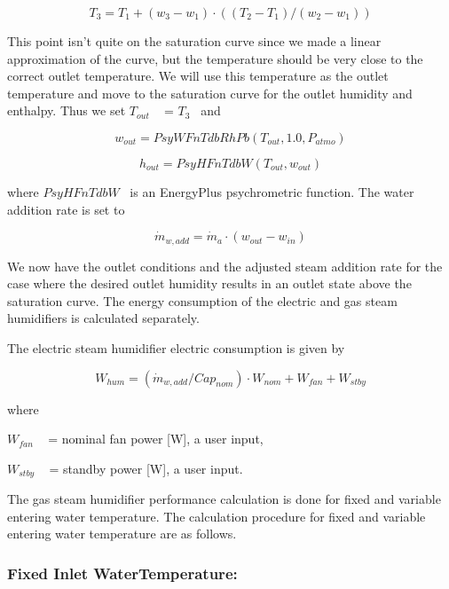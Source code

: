 \begin{equation}
{T_3} = {T_1} + ({w_3} - {w_1}) \cdot (({T_2} - {T_1})/({w_2} - {w_1}))
\end{equation}

This point isn't quite on the saturation curve since we made a linear approximation of the curve, but the temperature should be very close to the correct outlet temperature. We will use this temperature as the outlet temperature and move to the saturation curve for the outlet humidity and enthalpy. Thus we set \({T_{out}}\) ~ = \({T_3}\) ~and

\begin{equation}
{w_{out}} = PsyWFnTdbRhPb({T_{out}},1.0,{P_{atmo}})
\end{equation}

\begin{equation}
{h_{out}} = PsyHFnTdbW({T_{out}},{w_{out}})
\end{equation}

where \(PsyHFnTdbW\) ~is an EnergyPlus psychrometric function. The water addition rate is set to

\begin{equation}
{\dot m_{w,add}} = {\dot m_a} \cdot ({w_{out}} - {w_{in}})
\end{equation}

We now have the outlet conditions and the adjusted steam addition rate for the case where the desired outlet humidity results in an outlet state above the saturation curve. The energy consumption of the electric and gas steam humidifiers is calculated separately.

The electric steam humidifier electric consumption is given by

\begin{equation}
{W_{hum}} = ({\dot m_{w,add}}/Ca{p_{nom}}) \cdot {W_{nom}} + {W_{fan}} + {W_{stby}}
\end{equation}

where

\({W_{fan}}\) ~ = nominal fan power {[}W{]}, a user input,

\({W_{stby}}\) ~ = standby power {[}W{]}, a user input.

The gas steam humidifier performance calculation is done for fixed and variable entering water temperature. The calculation procedure for fixed and variable entering water temperature are as follows.

\subsubsection{Fixed Inlet WaterTemperature:}\label{fixed-inlet-watertemperature}

